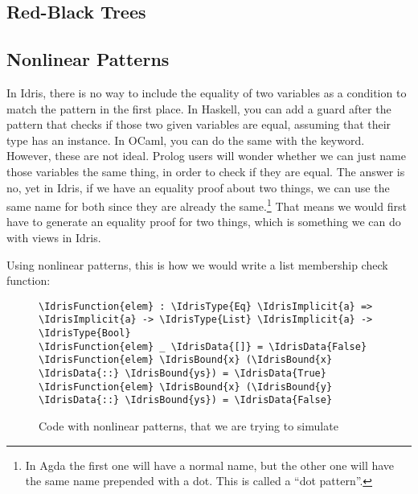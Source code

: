 


\subsection{Red-Black Trees}\label{ssec:rbt}



\subsection{Nonlinear Patterns}

In Idris, there is no way to include the equality of two variables as a condition to match the pattern in the first place.
In Haskell, you can add a guard after the pattern that checks if those two
given variables are equal, assuming that their type has an  instance.
In OCaml, you can do the same with the  keyword.
However, these are not ideal. Prolog users will wonder whether we can just name
those variables the same thing, in order to check if they are equal. The answer
is no, yet in Idris, if we have an equality proof about two things, we can use
the same name for both since they are already the same.\footnote{In Agda the first one will have a normal name, but the other one will have the same name prepended with a dot. This is called a ``dot pattern''.} That means we would
first have to generate an equality proof for two things, which is something we
can do with views in Idris.

Using nonlinear patterns, this is how we would write a list membership check
function:

\begin{figure}[ht]
\caption{Code with nonlinear patterns, that we are trying to simulate}
\label{code:nonlinear}
\begin{Verbatim}[framesep=2mm, label=\footnotesize{\normalfont{Idris}}, labelposition=topline]
\IdrisFunction{elem} : \IdrisType{Eq} \IdrisImplicit{a} => \IdrisImplicit{a} -> \IdrisType{List} \IdrisImplicit{a} -> \IdrisType{Bool}
\IdrisFunction{elem} _ \IdrisData{[]} = \IdrisData{False}
\IdrisFunction{elem} \IdrisBound{x} (\IdrisBound{x} \IdrisData{::} \IdrisBound{ys}) = \IdrisData{True}
\IdrisFunction{elem} \IdrisBound{x} (\IdrisBound{y} \IdrisData{::} \IdrisBound{ys}) = \IdrisData{False}
\end{Verbatim}
\end{figure}

